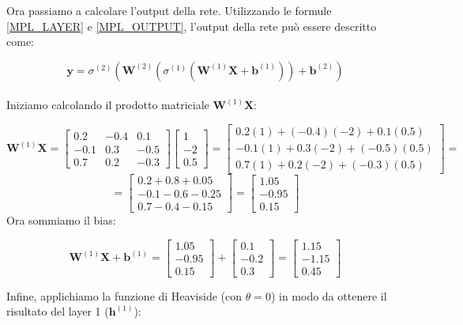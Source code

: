 \newpage
Ora passiamo a calcolare l'output della rete.
Utilizzando le formule \ref{MPL_LAYER} e \ref{MPL_OUTPUT}, l'output della rete 
può essere descritto come:

\[
    {\mathbf{y}} = \sigma^{(2)}\left( \mathbf{W}^{(2)}\left(\sigma^{(1)}\left( \mathbf{W}^{(1)}\mathbf{X} + {\mathbf{b}}^{(1)}\right)  \right)+ {\mathbf{b}}^{(2)}\right)
\]
\\
Iniziamo calcolando il prodotto matriciale \(\mathbf{W}^{(1)}\mathbf{X}\):

\[
\mathbf{W}^{(1)} \mathbf{X} = 
\begin{bmatrix}
0.2 & -0.4 & 0.1 \\
-0.1 & 0.3 & -0.5 \\
0.7 & 0.2 & -0.3
\end{bmatrix}
\begin{bmatrix}
1 \\ -2 \\ 0.5
\end{bmatrix}
=
\begin{bmatrix}
0.2(1) + (-0.4)(-2) + 0.1(0.5) \\
-0.1(1) + 0.3(-2) + (-0.5)(0.5) \\
0.7(1) + 0.2(-2) + (-0.3)(0.5)
\end{bmatrix}
=
\]
\[
= 
\begin{bmatrix}
0.2 + 0.8 + 0.05 \\
-0.1 - 0.6 - 0.25 \\
0.7 - 0.4 - 0.15
\end{bmatrix}
=
\begin{bmatrix}
1.05 \\ -0.95 \\ 0.15
\end{bmatrix}
\]
Ora sommiamo il bias:

\[
\mathbf{W}^{(1)} \mathbf{X} + \mathbf{b}^{(1)} = 
\begin{bmatrix}
1.05 \\ -0.95 \\ 0.15
\end{bmatrix}
+
\begin{bmatrix}
0.1 \\ -0.2 \\ 0.3
\end{bmatrix}
=
\begin{bmatrix}
1.15 \\ -1.15 \\ 0.45
\end{bmatrix}
\]

Infine, applichiamo la funzione di Heaviside (con \(\theta = 0\)) in modo
da ottenere il risultato del layer 1 ($\mathbf{h}^{(1)}$):

